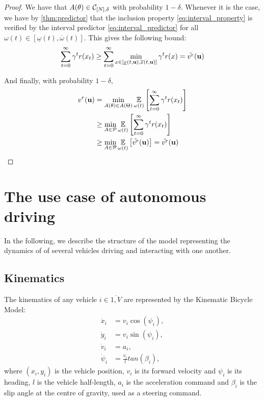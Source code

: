 \documentclass{article}
\begin{document}
\begin{proof}
We have that $A(\theta) \in \mathcal{C}_{[N],\delta}$ with probability $1-\delta$. Whenever it is the case, we have by \autoref{thm:predictor} that the inclusion property \eqref{eq:interval_property} is verified by the interval predictor \eqref{eq:interval_predictor} for all $\omega(t)\in[\underline{\omega}(t), \overline{\omega}(t)]$. This gives the following bound:
\begin{equation*}
 \sum_{t=0}^\infty \gamma^t r(x_t) \geq \sum_{t=0}^\infty \min_{x\in[\underline{x}(t, \mathbf{u}), \overline{x}(t, \mathbf{u})]} \gamma^t r(x) = \hat{v^r}(\mathbf{u})
\end{equation*}

And finally, with probability $1-\delta$,
\begin{align*}
v^r(\mathbf{u}) &= \min_{A(\theta) \in A(\Theta)} \operatorname*{\mathbb{E}}\limits_{\omega(t)}\left[\sum_{t=0}^\infty \gamma^t r(x_t)\right] \\
&\geq \min_{A \in \mathcal{P}} \operatorname*{\mathbb{E}}\limits_{\omega(t)}\left[\sum_{t=0}^\infty \gamma^t r(x_t)\right] \\
& \geq \min_{A \in \mathcal{P}} \operatorname*{\mathbb{E}}\limits_{\omega(t)}\left[\hat{v^r}(\mathbf{u})\right] = \hat{v^r}(\mathbf{u})
\end{align*}
\end{proof}

\section{The use case of autonomous driving}

In the following, we describe the structure of the model representing the dynamics of of several vehicles driving and interacting with one another.

\subsection{Kinematics}

The kinematics of any vehicle $i\in\overline{1,V}$ are represented by the Kinematic Bicycle Model:
\begin{align}
	\dot{x}_i &= v_i\cos(\psi_i), \nonumber\\
	\dot{y}_i &= v_i\sin(\psi_i), \nonumber\\
	\dot{v}_i &= a_i, \nonumber\\
	\dot{\psi}_i &= \frac{v_i}{l}tan(\beta_i), \nonumber
\end{align}
where $(x_i, y_i)$ is the vehicle position, $v_i$ is its forward velocity and $\psi_i$ is its heading, $l$ is the vehicle half-length, $a_i$ is the acceleration command and $\beta_i$ is the slip angle at the centre of gravity, used as a steering command.
\end{document}
